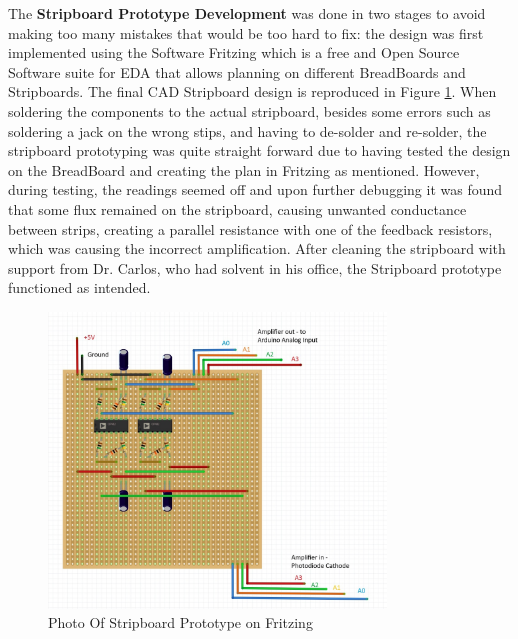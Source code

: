 \noindent The {\bfseries Stripboard Prototype Development} was done in two stages to avoid making too many mistakes that would be too hard to fix: the design was first implemented using the Software Fritzing which is a free and Open Source Software suite for \ac{EDA} that allows planning on different BreadBoards and Stripboards. The final CAD Stripboard design is reproduced in Figure \ref{fig:StripboardFritzing}.
When soldering the components to the actual stripboard, besides some errors such as soldering a jack on the wrong stips, and having to de-solder and re-solder, the stripboard prototyping was quite straight forward due to having tested the design on the BreadBoard and creating the plan in Fritzing as mentioned. However, during testing, the readings seemed off and upon further debugging it was found that some flux remained on the stripboard, causing unwanted conductance between strips, creating a parallel resistance with one of the feedback resistors, which was causing the incorrect amplification. After cleaning the stripboard with support from Dr. Carlos, who had solvent in his office, the Stripboard prototype functioned as intended. 
% 
\begin{figure}[htbp] %
  \centering
  \includegraphics[width=0.8\textwidth]{chapters/methodology/prototype/StripboardPhotoFritzing.jpg}
  \caption{Photo Of Stripboard Prototype on Fritzing}
  \label{fig:StripboardFritzing}
\end{figure}
% 
